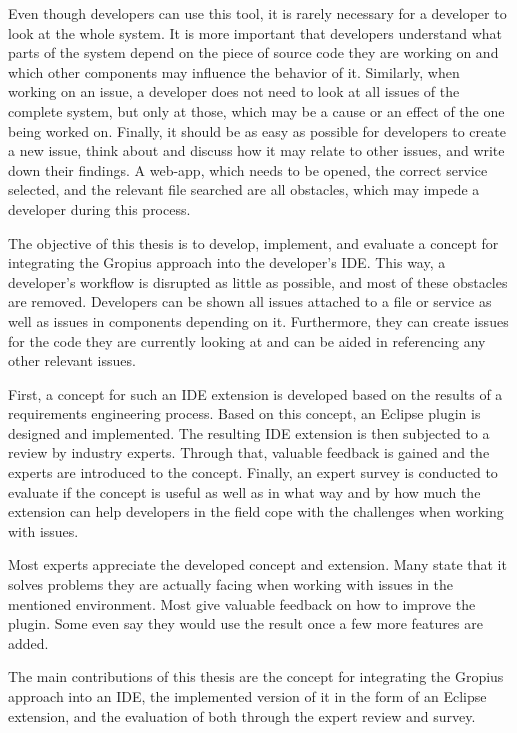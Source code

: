 Even though developers can use this tool, it is rarely necessary for a developer to look at the whole system. 
It is more important that developers understand what parts of the system depend on the piece of source code they are working on and which other components may influence the behavior of it. 
Similarly, when working on an issue, a developer does not need to look at all issues of the complete system, but only at those, which may be a cause or an effect of the one being worked on. 
Finally, it should be as easy as possible for developers to create a new issue, think about and discuss how it may relate to other issues, and write down their findings.
A web-app,  which needs to be opened, the correct service selected, and the relevant file searched are all obstacles, which may impede a developer during this process. 

The objective of this thesis is to develop, implement, and evaluate a concept for integrating the \gls{Gropius} approach into the developer's \gls{IDE}.
This way, a developer's workflow is disrupted as little as possible, and most of these obstacles are removed.
Developers can be shown all issues attached to a file or service as well as issues in components depending on it.
Furthermore, they can create issues for the code they are currently looking at and can be aided in referencing any other relevant issues.

First, a concept for such an \gls{IDE} extension is developed based on the results of a requirements engineering process.
Based on this concept, an \gls{Eclipse} plugin is designed and implemented.
The resulting \gls{IDE} extension is then subjected to a review by industry experts.
Through that, valuable feedback is gained and the experts are introduced to the concept.
Finally, an expert survey is conducted to evaluate if the concept is useful 
as well as in what way and by how much the extension can help developers in the field cope with the challenges when working with issues.

Most experts appreciate the developed concept and extension.
Many state that it solves problems they are actually facing when working with issues in the mentioned environment.
Most give valuable feedback on how to improve the plugin.
Some even say they would use the result once a few more features are added.

The main contributions of this thesis are the concept for integrating the \gls{Gropius} approach into an \gls{IDE},
the implemented version of it in the form of an \gls{Eclipse} extension, and the evaluation of both through the expert review and survey.

